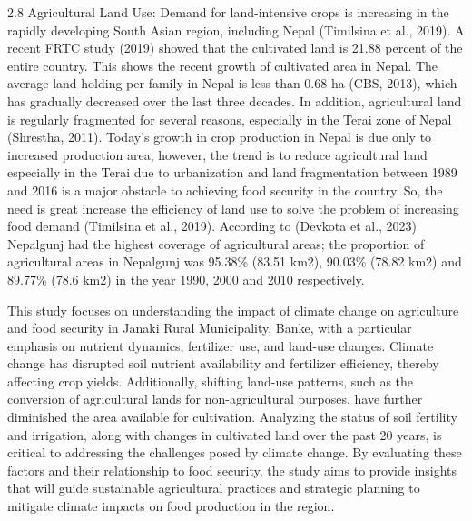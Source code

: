 2.8 Agricultural Land Use:
Demand for land-intensive crops is increasing in the rapidly developing South Asian region, including Nepal (Timilsina et al., 2019). A recent FRTC study (2019) showed that the cultivated land is 21.88 percent of the entire country. This shows the recent growth of cultivated area in Nepal. The average land holding per family in Nepal is less than 0.68 ha (CBS, 2013), which has gradually decreased over the last three decades. In addition, agricultural land is regularly fragmented for several reasons, especially in the Terai zone of Nepal (Shrestha, 2011). 
Today's growth in crop production in Nepal is due only to increased production area, however, the trend is to reduce agricultural land especially in the Terai due to urbanization and land fragmentation between 1989 and 2016 is a major obstacle to achieving food security in the country. So, the need is great increase the efficiency of land use to solve the problem of increasing food demand (Timilsina et al., 2019). According to (Devkota et al., 2023) Nepalgunj had the highest coverage of agricultural areas; the proportion of agricultural areas in Nepalgunj was 95.38\% (83.51 km2), 90.03\% (78.82 km2) and 89.77\% (78.6 km2) in the year 1990, 2000 and 2010 respectively.

This study focuses on understanding the impact of climate change on agriculture and food security in Janaki Rural Municipality, Banke, with a particular emphasis on nutrient dynamics, fertilizer use, and land-use changes. Climate change has disrupted soil nutrient availability and fertilizer efficiency, thereby affecting crop yields. Additionally, shifting land-use patterns, such as the conversion of agricultural lands for non-agricultural purposes, have further diminished the area available for cultivation. Analyzing the status of soil fertility and irrigation, along with changes in cultivated land over the past 20 years, is critical to addressing the challenges posed by climate change. By evaluating these factors and their relationship to food security, the study aims to provide insights that will guide sustainable agricultural practices and strategic planning to mitigate climate impacts on food production in the region.

